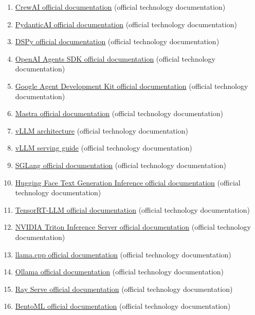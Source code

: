 \begin{enumerate}
\item \href{https://docs.crewai.com/}{CrewAI official documentation} (official technology documentation)
\item \href{https://ai.pydantic.dev/}{PydanticAI official documentation} (official technology documentation)
\item \href{https://dspy.ai/}{DSPy official documentation} (official technology documentation)
\item \href{https://openai.github.io/openai-agents-python/}{OpenAI Agents SDK official documentation} (official technology documentation)
\item \href{https://google.github.io/adk-docs/}{Google Agent Development Kit official documentation} (official technology documentation)
\item \href{https://mastra.ai/docs}{Mastra official documentation} (official technology documentation)
\item \href{https://docs.vllm.ai/en/latest/design/arch_overview/}{vLLM architecture} (official technology documentation)
\item \href{https://docs.vllm.ai/en/latest/serving/openai_compatible_server/}{vLLM serving guide} (official technology documentation)
\item \href{https://docs.sglang.ai/}{SGLang official documentation} (official technology documentation)
\item \href{https://huggingface.co/docs/text-generation-inference/index}{Hugging Face Text Generation Inference official documentation} (official technology documentation)
\item \href{https://nvidia.github.io/TensorRT-LLM/}{TensorRT-LLM official documentation} (official technology documentation)
\item \href{https://docs.nvidia.com/deeplearning/triton-inference-server/user-guide/docs/}{NVIDIA Triton Inference Server official documentation} (official technology documentation)
\item \href{https://github.com/ggml-org/llama.cpp}{llama.cpp official documentation} (official technology documentation)
\item \href{https://docs.ollama.com/}{Ollama official documentation} (official technology documentation)
\item \href{https://docs.ray.io/en/latest/serve/}{Ray Serve official documentation} (official technology documentation)
\item \href{https://docs.bentoml.com/}{BentoML official documentation} (official technology documentation)

\end{enumerate}
